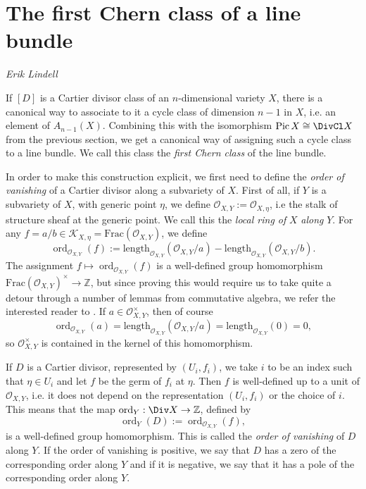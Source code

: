 \documentclass[a4paper,openany]{scrbook}
\DeclareMathOperator{\Pic}{Pic}
\DeclareMathOperator{\ord}{ord}
\newcommand{\chapterauthor}[1]{\hfill\emph{#1}\par\noindent}
\begin{document}
\section{The first Chern class of a line bundle}
\chapterauthor{Erik Lindell}

If $[D]$ is a Cartier divisor class of an $n$-dimensional variety $X$, there is a canonical way to associate to it a cycle class of dimension $n-1$ in $X$, i.e. an element of $A_{n-1}(X)$. Combining this with the isomorphism $\Pic X\cong\DivCl X$ from the previous section, we get a canonical way of assigning such a cycle class to a line bundle. We call this class the \textit{first Chern class} of the line bundle. 

In order to make this construction explicit, we first need to define the \textit{order of vanishing} of a Cartier divisor along a subvariety of $X$. First of all, if $Y$ is a subvariety of $X$, with generic point $\eta$, we define $\mathscr{O}_{X,Y}:=\mathscr{O}_{X,\eta}$, i.e the stalk of structure sheaf at the generic point. We call this the \textit{local ring of }$X$\textit{ along }$Y$. For any $f=a/b\in\mathscr{K}_{X,\eta}=\mathrm{Frac}(\mathscr{O}_{X,Y})$, we define
$$\ord_{\mathscr{O}_{X,Y}}(f):=\mathrm{length}_{\mathscr{O}_{X,Y}}(\mathscr{O}_{X,Y}/a)-\mathrm{length}_{\mathscr{O}_{X,Y}}(\mathscr{O}_{X,Y}/b).$$
The assignment $f\mapsto\ord_{\mathscr{O}_{X,Y}}(f)$ is a well-defined group homomorphism $\mathrm{Frac}(\mathscr{O}_{X,Y})^\times\to\mathbb{Z}$, but since proving this would require us to take quite a detour through a number of lemmas from commutative algebra, we refer the interested reader to \cite[Appendix A]{fulton:intersection-theory}. If $a\in\mathscr{O}_{X,Y}^\times$, then of course
$$\ord_{\mathscr{O}_{X,Y}}(a)=\mathrm{length}_{\mathscr{O}_{X,Y}}(\mathscr{O}_{X,Y}/a)=\mathrm{length}_{\mathscr{O}_{X,Y}}(0)=0,$$
so $\mathscr{O}_{X,Y}^\times$ is contained in the kernel of this homomorphism.

If $D$ is a Cartier divisor, represented by $(U_i,f_i)$, we take $i$ to be an index such that $\eta\in U_i$ and let $f$ be the germ of $f_i$ at $\eta$. Then $f$ is well-defined up to a unit of $\mathscr{O}_{X,Y}$, i.e. it does not depend on the representation $(U_i,f_i)$ or the choice of $i$. This means that the map $\ord_Y:\Div X\to\mathbb{Z}$, defined by 
$$\ord_Y(D):=\ord_{\mathscr{O}_{X,Y}}(f),$$
is a well-defined group homomorphism. This is called the \textit{order of vanishing} of $D$ along $Y$. If the order of vanishing is positive, we say that $D$ has a zero of the corresponding order along $Y$ and if it is negative, we say that it has a pole of the corresponding order along $Y$. 
\end{document}
